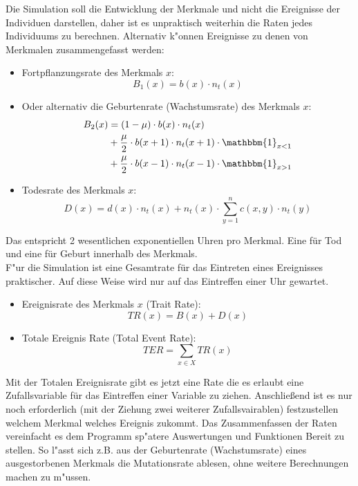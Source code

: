 \documentclass[11pt, a4paper, german]{article}
\begin{document}
	Die Simulation soll die Entwicklung der Merkmale und nicht die Ereignisse der Individuen darstellen, daher ist es unpraktisch weiterhin die Raten jedes Individuums zu berechnen. Alternativ k"onnen Ereignisse zu denen von Merkmalen zusammengefasst werden:
	\begin{itemize}
		\item Fortpflanzungsrate des Merkmals $ x $: 
		\[ B_1(x) = b(x) \cdot n_t(x) \]
		\item Oder alternativ die Geburtenrate (Wachstumsrate) des Merkmals $ x $: 
		\begin{align*}
			B_2(x)  & = (1 - \mu) \cdot b(x) \cdot n_t(x)\\
				  & + \frac{\mu}{2} \cdot b(x+1) \cdot n_t(x+1) \cdot \mathbbm{1}_{x<1}\\
				  & + \frac{\mu}{2} \cdot b(x-1) \cdot n_t(x-1) \cdot \mathbbm{1}_{x>1}
		\end{align*}
		\item Todesrate des Merkmals $ x $: 
		\[ D(x) = d(x) \cdot n_t(x) + n_t(x) \cdot \sum_{y=1}^{n} c(x,y) \cdot n_t(y) \]
	\end{itemize}
	Das entspricht 2 wesentlichen exponentiellen Uhren pro Merkmal. Eine für Tod und eine für Geburt innerhalb des Merkmals.\\
	F"ur die Simulation ist eine Gesamtrate für das Eintreten eines Ereignisses praktischer. Auf diese Weise wird nur auf das Eintreffen einer Uhr gewartet.
	\begin{itemize}
		\item Ereignisrate des Merkmals $ x $ (Trait Rate):
		\[ TR(x) = B(x) + D(x) \]
		\item Totale Ereignis Rate (Total Event Rate): 
		\[ TER = \sum_{x \in X} TR(x)\]
	\end{itemize}
	Mit der Totalen Ereignisrate gibt es jetzt eine Rate die es erlaubt eine Zufallsvariable für das Eintreffen einer Variable zu ziehen. Anschließend ist es nur noch erforderlich (mit der Ziehung zwei weiterer Zufallsvairablen) festzustellen welchem Merkmal welches Ereignis zukommt. Das Zusammenfassen der Raten vereinfacht es dem Programm sp"atere Auswertungen und Funktionen Bereit zu stellen. So l"asst sich z.B. aus der Geburtenrate (Wachstumsrate) eines ausgestorbenen Merkmals die Mutationsrate ablesen, ohne weitere Berechnungen machen zu m"ussen.\\
	
\end{document}
